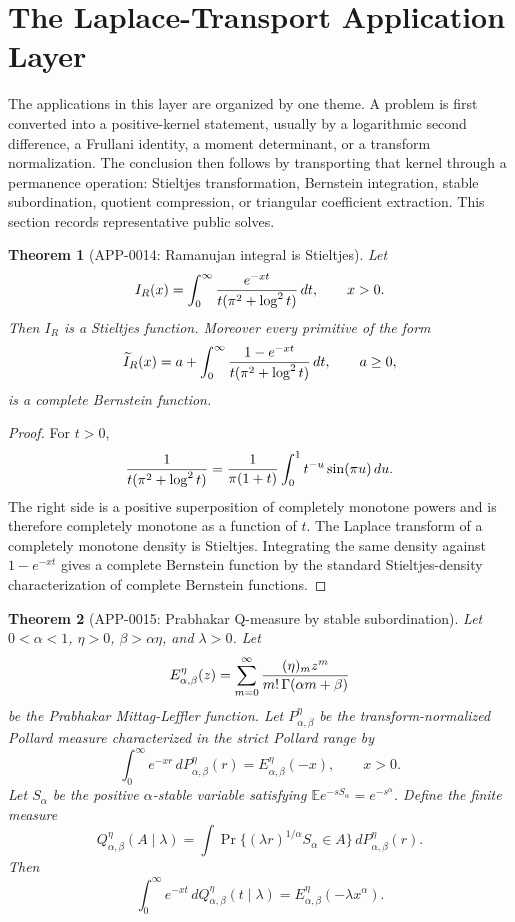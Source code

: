 \documentclass[11pt]{article}
\numberwithin{equation}{section}
\newtheorem{theorem}{Theorem}[section]
\theoremstyle{definition}
\theoremstyle{remark}
\newcommand{\1}{\mathbf 1}
\begin{document}
\section{The Laplace-Transport Application Layer}
\label{sec:transport-layer}

The applications in this layer are organized by one theme.  A problem is first converted
into a positive-kernel statement, usually by a logarithmic second difference, a
Frullani identity, a moment determinant, or a transform normalization.  The
conclusion then follows by transporting that kernel through a permanence
operation: Stieltjes transformation, Bernstein integration, stable
subordination, quotient compression, or triangular coefficient extraction.  This
section records representative public solves.

\begin{theorem}[APP-0014: Ramanujan integral is Stieltjes]
\label{thm:app14-ramanujan-stieltjes}
Let
\[
  I_R(x)=\int_0^\infty {e^{-xt}\over t(\pi^2+\log^2 t)}\,dt,
  \qquad x>0 .
\]
Then \(I_R\) is a Stieltjes function.  Moreover every primitive of the form
\[
  \widetilde I_R(x)=a+\int_0^\infty
       {1-e^{-xt}\over t(\pi^2+\log^2 t)}\,dt,\qquad a\ge0,
\]
is a complete Bernstein function.
\end{theorem}

\begin{proof}
For \(t>0\),
\[
 {1\over t(\pi^2+\log^2t)}
   ={1\over \pi(1+t)}\int_0^1 t^{-u}\sin(\pi u)\,du .
\]
The right side is a positive superposition of completely monotone powers and is
therefore completely monotone as a function of \(t\).  The Laplace transform of
a completely monotone density is Stieltjes.  Integrating the same density
against \(1-e^{-xt}\) gives a complete Bernstein function by the standard
Stieltjes-density characterization of complete Bernstein functions.
\end{proof}

\begin{theorem}[APP-0015: Prabhakar Q-measure by stable subordination]
\label{thm:app15-prabhakar-subordination}
Let \(0<\alpha<1\), \(\eta>0\), \(\beta>\alpha\eta\), and \(\lambda>0\).
Let
\[
  E_{\alpha,\beta}^{\eta}(z)
  =\sum_{m=0}^{\infty}{(\eta)_m z^m\over m!\,\Gamma(\alpha m+\beta)}
\]
be the Prabhakar Mittag-Leffler function.  Let
\(P_{\alpha,\beta}^{\eta}\) be the transform-normalized Pollard measure
characterized in the strict Pollard range by
\[
  \int_0^\infty e^{-xr}\,dP_{\alpha,\beta}^{\eta}(r)
  =E_{\alpha,\beta}^{\eta}(-x),\qquad x>0.
\]
Let \(S_\alpha\) be the positive \(\alpha\)-stable variable satisfying
\(\mathbb E e^{-sS_\alpha}=e^{-s^\alpha}\).  Define the finite measure
\[
  Q_{\alpha,\beta}^{\eta}(A\mid\lambda)
  =\int \Pr\{(\lambda r)^{1/\alpha}S_\alpha\in A\}\,
       dP_{\alpha,\beta}^{\eta}(r).
\]
Then
\[
  \int_0^\infty e^{-xt}\,dQ_{\alpha,\beta}^{\eta}(t\mid\lambda)
  =E_{\alpha,\beta}^{\eta}(-\lambda x^\alpha).
\]
\end{theorem}
\end{document}
